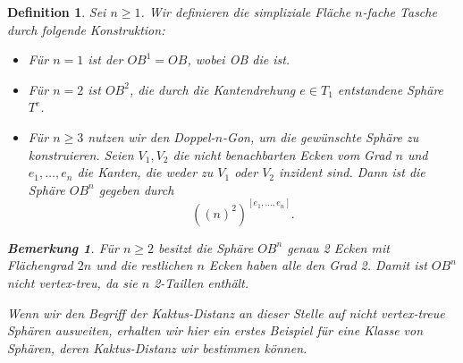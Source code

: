 \documentclass[12pt,titlepage,twoside,cleardoublepage]{article}
\theoremstyle{nummermitklammern}
\newtheorem{definition}[temp]{Definition}
\newtheorem{bemerkung}[temp]{Bemerkung}
\newtheorem{definition}[zahl]{Definition}
\newtheorem{bemerkung}[zahl]{Bemerkung}
\numberwithin{equation}{section}
\begin{document}
\begin{definition}
Sei $n\geq 1$. Wir definieren die simpliziale Fläche $n$-fache Tasche durch folgende Konstruktion:
\begin{itemize}
\item Für $n=1$ ist der $OB^1=OB$, wobei OB die ist.
\item Für $n=2$ ist $OB^2$, die durch die Kantendrehung $e\in T_1$ entstandene Sphäre $T^e$.
\item Für $n\geq 3$ nutzen wir den Doppel-$n$-Gon, um die gewünschte Sphäre zu konstruieren. Seien $V_1,V_2$ die nicht benachbarten Ecken vom Grad $n$ und $e_1,\ldots, e_n$ die Kanten, die weder zu $V_1$ oder $V_2$ inzident sind. Dann ist die Sphäre $OB^n$ gegeben durch
\[
{((n)^2)}^{[e_1,\ldots,e_n]}.
\]
\end{itemize}
\begin{bemerkung}
Für $n\geq 2$ besitzt die Sphäre $OB^n$ genau 2 Ecken mit Flächengrad $2n$ und die restlichen $n$ Ecken haben alle den Grad 2. Damit ist $OB^n$ nicht vertex-treu, da sie $n$ 2-Taillen enthält.
\end{bemerkung}
Wenn wir den Begriff der Kaktus-Distanz an dieser Stelle auf nicht vertex-treue Sphären ausweiten, erhalten wir hier ein erstes Beispiel für eine Klasse von Sphären, deren Kaktus-Distanz wir bestimmen können. 

\end{definition}
\end{document}
